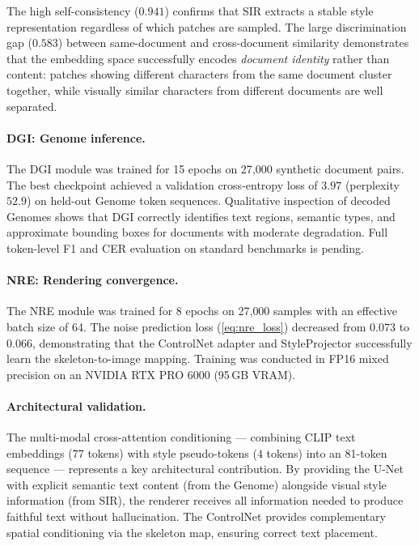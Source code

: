 \documentclass[conference]{IEEEtran}
\newcommand{\dgi}{\textsc{DGI}}
\newcommand{\sir}{\textsc{SIR}}
\newcommand{\nre}{\textsc{NRE}}
\begin{document}
The high self-consistency ($0.941$) confirms that \sir{} extracts a stable style
representation regardless of which patches are sampled.  The large discrimination
gap ($0.583$) between same-document and cross-document similarity demonstrates that
the embedding space successfully encodes \emph{document identity} rather than
content: patches showing different characters from the same document cluster
together, while visually similar characters from different documents are well
separated.

\paragraph{DGI: Genome inference.}
The \dgi{} module was trained for 15 epochs on 27{,}000 synthetic document pairs.
The best checkpoint achieved a validation cross-entropy loss of $3.97$
(perplexity $52.9$) on held-out Genome token sequences.  Qualitative inspection
of decoded Genomes shows that \dgi{} correctly identifies text regions, semantic
types, and approximate bounding boxes for documents with moderate degradation.
Full token-level F1 and CER evaluation on standard benchmarks is pending.

\paragraph{NRE: Rendering convergence.}
The \nre{} module was trained for 8 epochs on 27{,}000 samples with an effective
batch size of 64.  The noise prediction loss (\cref{eq:nre_loss}) decreased from
$0.073$ to $0.066$, demonstrating that the ControlNet adapter and StyleProjector
successfully learn the skeleton-to-image mapping.  Training was conducted in FP16
mixed precision on an NVIDIA RTX PRO 6000 (95\,GB VRAM).

\paragraph{Architectural validation.}
The multi-modal cross-attention conditioning --- combining CLIP text embeddings
($77$ tokens) with style pseudo-tokens ($4$ tokens) into an 81-token sequence ---
represents a key architectural contribution.  By providing the U-Net with explicit
semantic text content (from the Genome) alongside visual style information
(from \sir{}), the renderer receives all information needed to produce faithful
text without hallucination.  The ControlNet provides complementary spatial
conditioning via the skeleton map, ensuring correct text placement.
\end{document}
